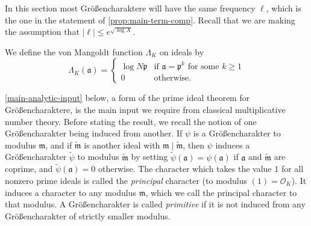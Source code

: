 \documentclass[11pt,reqno]{amsart}
\numberwithin{equation}{section}
\theoremstyle{definition}
\theoremstyle{remark}
\newcommand{\mf}{\mathfrak}
\renewcommand{\le}{\leqslant}
\renewcommand{\ge}{\geqslant}
\renewcommand\O{\mathcal{O}}
\begin{document}
In this section most Gr\"o{\ss}encharaktere will have the same frequency $\ell$, which is the one in the statement of \cref{prop:main-term-comp}. Recall that we are making the assumption that $|\ell| \le e^{\sqrt{\log X}}$.


We define the von Mangoldt function $\Lambda_K$ on ideals by
\[ \Lambda_K(\mf{a}) = \left\{ \begin{array}{ll} \log N\mf{p} & \mbox{if $\mf{a} = \mf{p}^k$ for some $k \ge 1$} \\ 0 & \mbox{otherwise}. \end{array}\right.\]

\cref{main-analytic-input} below, a form of the prime ideal theorem for Gr\"o{\ss}encharaktere, is the main input we require from classical multiplicative number theory. Before stating the result, we recall the notion of one Gr\"o{\ss}encharakter being induced from another. If $\psi$ is a Gr\"o{\ss}encharakter to modulus $\mf{m}$, and if $\tilde{\mf{m}}$ is another ideal with $\mf{m} \mid \tilde{\mf{m}}$, then $\psi$ induces a Gr\"o{\ss}encharakter $\tilde{\psi}$ to modulus $\tilde{\mf{m}}$ by setting $\tilde{\psi}(\mf{a}) = \psi(\mf{a})$ if $\mf{a}$ and $\tilde{\mf{m}}$ are coprime, and $\tilde{\psi}(\mf{a}) = 0$ otherwise. The character which takes the value $1$ for all nonzero prime ideals is called the \emph{principal} character (to modulus $(1) = \O_K$). It induces a character to any modulus $\mf{m}$, which we call the principal character to that modulus. A Gr\"o{\ss}encharakter is called \emph{primitive} if it is not induced from any Gr\"o{\ss}encharakter of strictly smaller modulus. 
\end{document}
